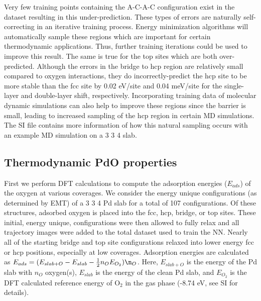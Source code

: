 \documentclass[12pt]{cmuthesis}
\begin{document}
Very few training points containing the A-C-A-C configuration exist in the dataset resulting in this under-prediction. These types of errors are naturally self-correcting in an iterative training process. Energy minimization algorithms will automatically sample these regions which are important for certain thermodynamic applications. Thus, further training iterations could be used to improve this result. The same is true for the top sites which are both over-predicted. Although the errors in the bridge to hcp region are relatively small compared to oxygen interactions, they do incorrectly-predict the hcp site to be more stable than the fcc site by 0.02 eV/site and 0.04 meV/site for the single-layer and double-layer shift, respectively. Incorporating training data of molecular dynamic simulations can also help to improve these regions since the barrier is small, leading to increased sampling of the hcp region in certain MD simulations. The SI file contains more information of how this natural sampling occurs with an example MD simulation on a 3 \texttimes{} 3 \texttimes{} 4 slab.

\subsection{Thermodynamic PdO properties}
\label{sec:org20e5a91}
First we perform DFT calculations to compute the adsorption energies (\(E_{ads}\)) of the oxygen at various coverages. We consider the energy unique configurations (as determined by EMT) of a 3 \texttimes{} 3 \texttimes{} 4 Pd slab for a total of 107 configurations. Of these structures, adsorbed oxygen is placed into the fcc, hcp, bridge, or top sites. These initial, energy unique, configurations were then allowed to fully relax and all trajectory images were added to the total dataset used to train the NN. Nearly all of the starting bridge and top site configurations relaxed into lower energy fcc or hcp positions, especially at low coverages. Adsorption energies are calculated as \(E_{ads} = (E_{slab+O} - E_{slab} - \frac{1}{2} n_{O} E_{O_{2}})\n_{O}\). Here, \(E_{slab+O}\) is the energy of the Pd slab with \(n_{O}\) oxygen(s), \(E_{slab}\) is the energy of the clean Pd slab, and \(E_{O_{2}}\) is the DFT calculated reference energy of O\(_{\text{2}}\) in the gas phase (-8.74 eV, see SI for details).
\end{document}
